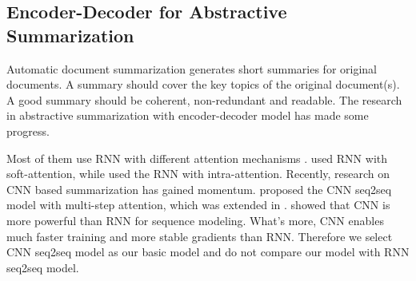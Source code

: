 \subsection{Encoder-Decoder for Abstractive Summarization}
Automatic document summarization generates short summaries for original
documents. A summary should cover the key topics of 
the original document(s). A good summary should be coherent, 
non-redundant and readable\cite{YaoWX17}.
The research in abstractive summarization with 
encoder-decoder model
\cite{SutskeverVL14,RushCW15,ChopraAR16,NallapatiZSGX16,SeeLM17,PaulusXS17,abs-1711-05217} 
has made some progress.

Most of them use RNN with different attention mechanisms \cite{NallapatiZSGX16,SeeLM17,PaulusXS17}. 
\citet{RushCW15} used RNN with
soft-attention, 
while \citet{PaulusXS17} used the RNN with intra-attention.
Recently, research on CNN based summarization has gained momentum. 
\citet{gehring2017convs2s} proposed the CNN seq2seq model 
with multi-step attention,  which was extended in \cite{abs-1711-05217}.
\citet{bai2018empirical} showed that CNN is more powerful than 
RNN for sequence modeling.
What's more, CNN enables much faster training and more stable gradients 
than RNN. Therefore we select CNN seq2seq model as our basic model and 
do not compare our model with RNN seq2seq model. 



